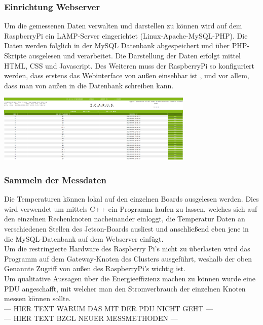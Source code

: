 \subsubsection{Einrichtung Webserver}
Um die gemessenen Daten verwalten und darstellen zu können wird auf dem RaspberryPi ein LAMP-Server eingerichtet (Linux-Apache-MySQL-PHP). Die Daten werden folglich in der MySQL Datenbank abgespeichert und über PHP-Skripte ausgelesen und verarbeitet. Die Darstellung der Daten erfolgt mittel HTML, CSS und Javascript. Des Weiteren muss der RaspberryPi so konfiguriert werden, dass erstens das Webinterface von außen einsehbar ist , und vor allem, dass man von außen in die Datenbank schreiben kann.

\begin{minipage}{\textwidth}

\begin{center}
	\includegraphics[width=0.7\textwidth]{./Bilder/Dashboard/Dashboard_frontend.png}
	\label{fig:sample_figure}

\end{center}	
\end{minipage}

\subsubsection{Sammeln der Messdaten}
Die Temperaturen können lokal auf den einzelnen Boards ausgelesen werden. Dies wird verwendet um mittels C++ ein Programm laufen zu lassen, welches sich auf den einzelnen Rechenknoten nacheinander einloggt, die Temperatur Daten an verschiedenen Stellen des Jetson-Boards ausliest und anschließend eben jene in die MySQL-Datenbank auf dem Webserver einfügt.\\
Um die restringierte Hardware des Raspberry Pi's nicht zu überlasten wird das Programm auf dem Gateway-Knoten des Clusters ausgeführt, weshalb der oben Genannte Zugriff von außen des RaspberryPi's wichtig ist. \\
Um qualitative Aussagen über die Energieeffizienz machen zu können wurde eine PDU angeschafft, mit welcher man den Stromverbrauch der einzelnen Knoten messen können sollte. \\
--- HIER TEXT WARUM DAS MIT DER PDU NICHT GEHT ---\\
--- HIER TEXT BZGL NEUER MESSMETHODEN ---